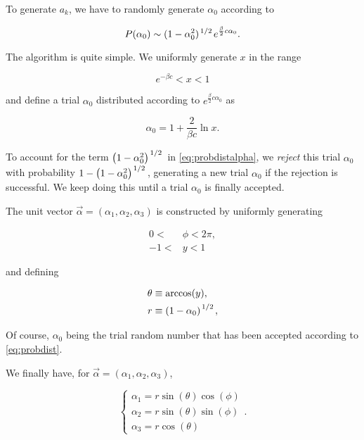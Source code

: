 \documentclass[reqno,12pt]{article}
\numberwithin{equation}{section}
\begin{document}
To generate $a_k$, we have to randomly generate $\alpha_0$ according to

\begin{equation} \label{eq:probdistalpha}
	P(\alpha_0) \sim (1 - \alpha_0^2)^{\flatfrac{1}{2}} e^{\frac{\beta}{2}c\alpha_0}.
\end{equation}

The algorithm is quite simple. We uniformly generate $x$ in the range 

\begin{equation}
	e^{-\beta c} < x < 1
\end{equation} 

and define a trial $\alpha_0$ distributed according to $e^{\frac{\beta}{2}c\alpha_0}$ as

\begin{equation}
	\alpha_0 = 1 + \frac{2}{\beta c}\ln{x}.
\end{equation}

To account for the term $\qty(1 - \alpha_0^2)^{\flatfrac{1}{2}}$ in \eqref{eq:probdistalpha}, we \textit{reject} this trial
$\alpha_0$ with probability $1 - \qty(1 - \alpha_0^2)^{\flatfrac{1}{2}}$, generating a new trial $\alpha_0$ if 
the rejection is successful. We keep doing this until a trial $\alpha_0$ is finally accepted. 

The unit vector $\vec{\alpha} = (\alpha_1, \alpha_2, \alpha_3)$ is constructed by uniformly generating 

\begin{equation}
	\begin{aligned}
		0 < &\phi < 2\pi, \\
		-1 < &y < 1
	\end{aligned}
\end{equation}

and defining 

\begin{equation}
	\begin{aligned}
		\theta &\equiv \arccos(y), \\
		r &\equiv \qty(1 - \alpha_0)^{\flatfrac{1}{2}},
	\end{aligned}
\end{equation}

Of course, $\alpha_0$ being the trial random number that has been accepted according to \eqref{eq:probdist}. 

We finally have, for $\vec{\alpha} = (\alpha_1, \alpha_2, \alpha_3)$,

\begin{equation}
	\begin{cases}
		\alpha_1 = r \sin(\theta) \cos(\phi) \\
		\alpha_2 = r \sin(\theta) \sin(\phi) \\
		\alpha_3 = r \cos(\theta)
	\end{cases}.
\end{equation}
\end{document}
